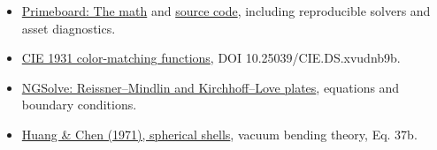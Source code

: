 \documentclass[11pt,letterpaper]{article}
\begin{document}
{\small
\begin{itemize}
\item \href{https://primeboard.jacksonwalters.com/\#the-math}{Primeboard: The math} and \href{https://github.com/DC-Creatives-Club/primeboard}{source code}, including reproducible solvers and asset diagnostics.
\item \href{https://cie.co.at/datatable/cie-1931-colour-matching-functions-2-degree-observer}{CIE 1931 color-matching functions}, DOI 10.25039/CIE.DS.xvudnb9b.
\item \href{https://docu.ngsolve.org/ngs24/SaS/plates_derivation.html}{NGSolve: Reissner--Mindlin and Kirchhoff--Love plates}, equations and boundary conditions.
\item \href{https://repository.library.noaa.gov/view/noaa/34603/noaa_34603_DS1.pdf}{Huang \& Chen (1971), spherical shells}, vacuum bending theory, Eq. 37b.
\end{itemize}}
\end{document}
